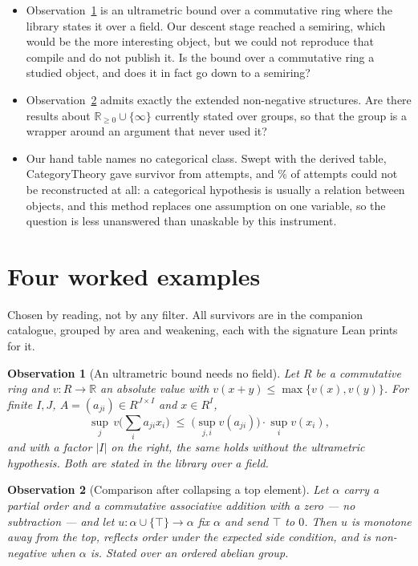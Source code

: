 \documentclass[11pt]{article}
\newtheorem{observation}{Observation}
\begin{document}
\begin{itemize}
\item Observation~\ref{obs:ultrametric} is an ultrametric bound over a
  commutative ring where the library states it over a field. Our descent stage
  reached a semiring, which would be the more interesting object, but we could
  not reproduce that compile and do not publish it. Is the bound over a
  commutative ring a studied object, and does it in fact go down to a semiring?
\item Observation~\ref{obs:withtop} admits exactly the extended non-negative
  structures. Are there results about $\mathbb{R}_{\ge 0} \cup \{\infty\}$
  currently stated over groups, so that the group is a wrapper around an
  argument that never used it?
\item Our hand table names no categorical class. Swept with the derived table,
  CategoryTheory gave \catSurvivors{} survivor from \catAttempts{} attempts, and
  \catContextPercent{}\% of attempts could not be reconstructed at all: a
  categorical hypothesis is usually a relation between objects, and this method
  replaces one assumption on one variable, so the question is less unanswered
than unaskable by this instrument.
\end{itemize}

\appendix

\section{Four worked examples}\label{app:obs}

Chosen by reading, not by any filter. All \allSurvivors{} survivors are in the
companion catalogue, grouped by area and weakening, each with the signature Lean
prints for it.

\begin{observation}[An ultrametric bound needs no field]\label{obs:ultrametric}
Let $R$ be a commutative ring and $v \colon R \to \mathbb{R}$ an absolute value with
$v(x+y) \le \max\{v(x),v(y)\}$. For finite $I,J$, $A = (a_{ji}) \in R^{J\times
I}$ and $x \in R^{I}$,
\[
  \sup_{j}\, v\!\Big(\sum_{i} a_{ji} x_i\Big)
  \;\le\; \Big(\sup_{j,i} v(a_{ji})\Big)\cdot \sup_{i} v(x_i),
\]
and with a factor $|I|$ on the right, the same holds without the ultrametric
hypothesis. Both are stated in the library over a field.
\end{observation}

\begin{observation}[Comparison after collapsing a top element]\label{obs:withtop}
Let $\alpha$ carry a partial order and a commutative associative addition with
a zero --- no subtraction ---
and let $u \colon \alpha \cup \{\top\} \to \alpha$ fix $\alpha$ and send $\top$
to $0$. Then $u$ is monotone away from the top, reflects order under the
expected side condition, and is non-negative when $\alpha$ is. Stated over an
ordered abelian group.
\end{observation}
\end{document}
